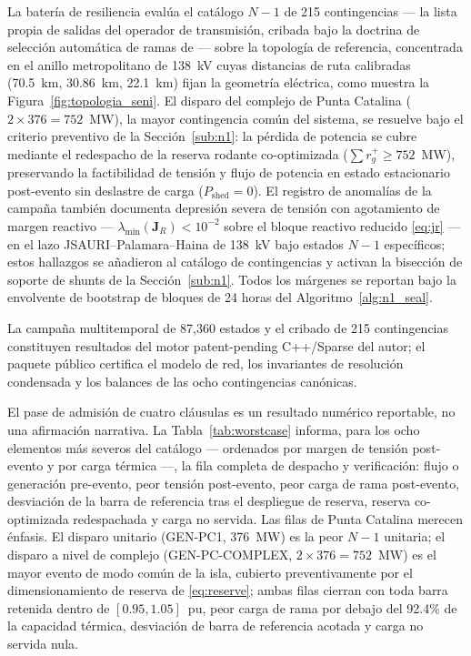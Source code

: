 La batería de resiliencia evalúa el catálogo $N-1$ de 215 contingencias --- la lista propia de salidas del operador de transmisión, cribada bajo la doctrina de selección automática de ramas de \cite{ejebe1979} --- sobre la topología de referencia, concentrada en el anillo metropolitano de 138~kV cuyas distancias de ruta calibradas (70.5~km, 30.86~km, 22.1~km) fijan la geometría eléctrica, como muestra la Figura~\ref{fig:topologia_seni}. El disparo del complejo de Punta Catalina ($2 \times 376 = 752$~MW), la mayor contingencia común del sistema, se resuelve bajo el criterio preventivo de la Sección~\ref{sub:n1}: la pérdida de potencia se cubre mediante el redespacho de la reserva rodante co-optimizada ($\sum r_g^+ \ge 752$~MW), preservando la factibilidad de tensión y flujo de potencia en estado estacionario post-evento sin deslastre de carga ($P_{\mathrm{shed}} = 0$). El registro de anomalías de la campaña también documenta depresión severa de tensión con agotamiento de margen reactivo --- $\lambda_{\min}(\mathbf{J}_R) < 10^{-2}$ sobre el bloque reactivo reducido \eqref{eq:jr} --- en el lazo JSAURI--Palamara--Haina de 138~kV bajo estados $N-1$ específicos; estos hallazgos se añadieron al catálogo de contingencias y activan la bisección de soporte de shunts de la Sección~\ref{sub:n1}. Todos los márgenes se reportan bajo la envolvente de bootstrap de bloques de 24 horas del Algoritmo~\ref{alg:n1_seal}.

La campaña multitemporal de 87,360 estados y el cribado de 215 contingencias constituyen resultados del motor patent-pending C++/Sparse del autor; el paquete público certifica el modelo de red, los invariantes de resolución condensada y los balances de las ocho contingencias canónicas.

El pase de admisión de cuatro cláusulas es un resultado numérico reportable, no una afirmación narrativa. La Tabla~\ref{tab:worstcase} informa, para los ocho elementos más severos del catálogo --- ordenados por margen de tensión post-evento y por carga térmica ---, la fila completa de despacho y verificación: flujo o generación pre-evento, peor tensión post-evento, peor carga de rama post-evento, desviación de la barra de referencia tras el despliegue de reserva, reserva co-optimizada redespachada y carga no servida. Las filas de Punta Catalina merecen énfasis. El disparo unitario (GEN-PC1, 376~MW) es la peor $N-1$ unitaria; el disparo a nivel de complejo (GEN-PC-COMPLEX, $2 \times 376 = 752$~MW) es el mayor evento de modo común de la isla, cubierto preventivamente por el dimensionamiento de reserva de \eqref{eq:reserve}; ambas filas cierran con toda barra retenida dentro de $[0.95, 1.05]$~pu, peor carga de rama por debajo del 92.4\% de la capacidad térmica, desviación de barra de referencia acotada y carga no servida nula. 

